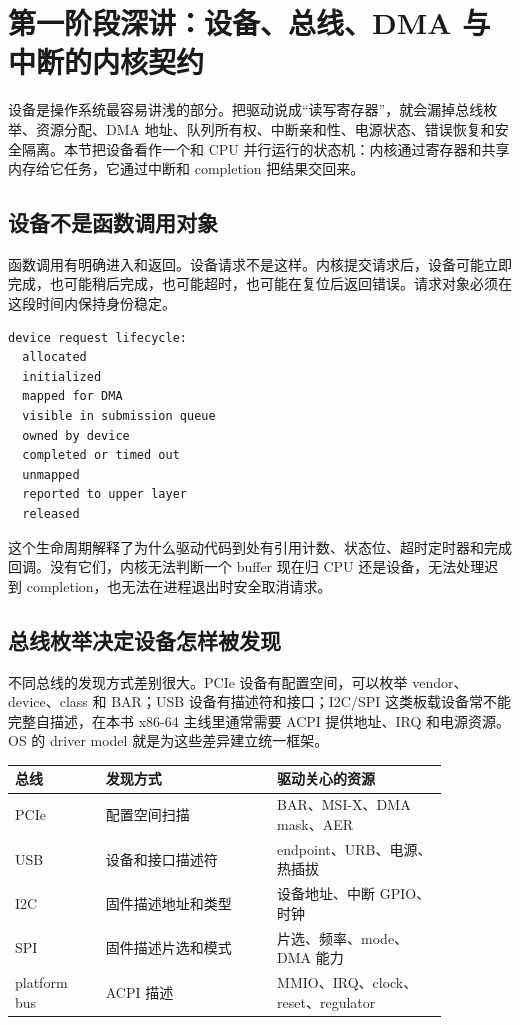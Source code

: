 \section{第一阶段深讲：设备、总线、DMA 与中断的内核契约}

设备是操作系统最容易讲浅的部分。把驱动说成“读写寄存器”，就会漏掉总线枚举、资源分配、DMA 地址、队列所有权、中断亲和性、电源状态、错误恢复和安全隔离。本节把设备看作一个和 CPU 并行运行的状态机：内核通过寄存器和共享内存给它任务，它通过中断和 completion 把结果交回来。

\subsection{设备不是函数调用对象}

函数调用有明确进入和返回。设备请求不是这样。内核提交请求后，设备可能立即完成，也可能稍后完成，也可能超时，也可能在复位后返回错误。请求对象必须在这段时间内保持身份稳定。

\begin{lstlisting}
device request lifecycle:
  allocated
  initialized
  mapped for DMA
  visible in submission queue
  owned by device
  completed or timed out
  unmapped
  reported to upper layer
  released
\end{lstlisting}

这个生命周期解释了为什么驱动代码到处有引用计数、状态位、超时定时器和完成回调。没有它们，内核无法判断一个 buffer 现在归 CPU 还是设备，无法处理迟到 completion，也无法在进程退出时安全取消请求。

\subsection{总线枚举决定设备怎样被发现}

不同总线的发现方式差别很大。PCIe 设备有配置空间，可以枚举 vendor、device、class 和 BAR；USB 设备有描述符和接口；I2C/SPI 这类板载设备常不能完整自描述，在本书 x86-64 主线里通常需要 ACPI 提供地址、IRQ 和电源资源。OS 的 driver model 就是为这些差异建立统一框架。

\begin{longtable}{p{0.18\linewidth}p{0.34\linewidth}p{0.34\linewidth}}
\toprule
总线 & 发现方式 & 驱动关心的资源 \\
\midrule
PCIe & 配置空间扫描 & BAR、MSI-X、DMA mask、AER \\
USB & 设备和接口描述符 & endpoint、URB、电源、热插拔 \\
I2C & 固件描述地址和类型 & 设备地址、中断 GPIO、时钟 \\
SPI & 固件描述片选和模式 & 片选、频率、mode、DMA 能力 \\
platform bus & ACPI 描述 & MMIO、IRQ、clock、reset、regulator \\
\bottomrule
\end{longtable}


